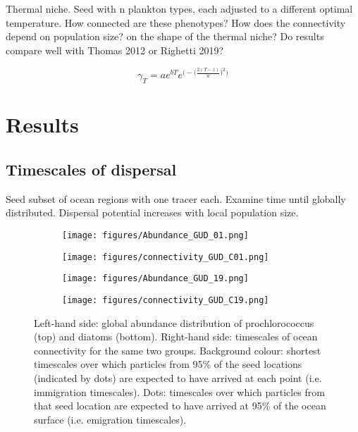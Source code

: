 \documentclass[12pt]{article}
\begin{document}
Thermal niche. Seed with n plankton types, each adjusted to a different optimal temperature. How connected are these phenotypes? How does the connectivity depend on population size? on the shape of the thermal niche? Do results compare well with Thomas 2012 or Righetti 2019?

\begin{equation}
\gamma_T = a e^{bT} e^{\Big(-\big(\frac{2(T-z)}{w}\big)^2\Big)}
\end{equation}


\section{Results}

\subsection{Timescales of dispersal}

Seed subset of ocean regions with one tracer each. Examine time until globally distributed. Dispersal potential increases with local population size.


\begin{figure}[htp!]
\begin{subfigure}{0.5\textwidth}
\centering
\texttt{[image: figures/Abundance\_GUD\_01.png]}
\end{subfigure}
\begin{subfigure}{0.5\textwidth}
\centering
\texttt{[image: figures/connectivity\_GUD\_C01.png]}
\end{subfigure}
\begin{subfigure}{0.5\textwidth}
\centering
\texttt{[image: figures/Abundance\_GUD\_19.png]}
\end{subfigure}
\begin{subfigure}{0.5\textwidth}
\centering
\texttt{[image: figures/connectivity\_GUD\_C19.png]}
\end{subfigure}
\caption{Left-hand side: global abundance distribution of prochlorococcus (top) and diatoms (bottom). Right-hand side: timescales of ocean connectivity for the same two groups. Background colour: shortest timescales over which particles from 95\% of the seed locations (indicated by dots) are expected to have arrived at each point (i.e. immigration timescales). Dots: timescales over which particles from that seed location are expected to have arrived at 95\% of the ocean surface (i.e. emigration timescales).}
\label{connectivity_90_prctile}
\end{figure}
\end{document}
